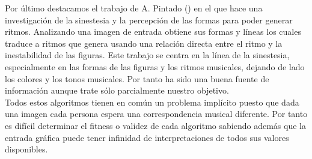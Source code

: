 Por último destacamos el trabajo de A. Pintado (\cite{portutesis}) en el que hace una investigación de la sinestesia y la percepción de las formas para poder generar ritmos. Analizando una imagen de entrada obtiene sus formas y líneas los cuales traduce a ritmos que genera usando  una relación directa entre el ritmo y la inestabilidad de las figuras. Este trabajo se centra en la línea de la sinestesia, especialmente en las formas de las figuras y los ritmos musicales, dejando de lado los colores y los tonos musicales. Por tanto ha sido una buena fuente de información aunque trate sólo parcialmente nuestro objetivo.\\ 

Todos estos algoritmos tienen en común un problema implícito puesto que dada una imagen cada persona espera una correspondencia musical diferente. Por tanto es difícil determinar el fitness o validez de cada algoritmo sabiendo además que la entrada gráfica puede tener infinidad de interpretaciones de todos sus valores disponibles.

